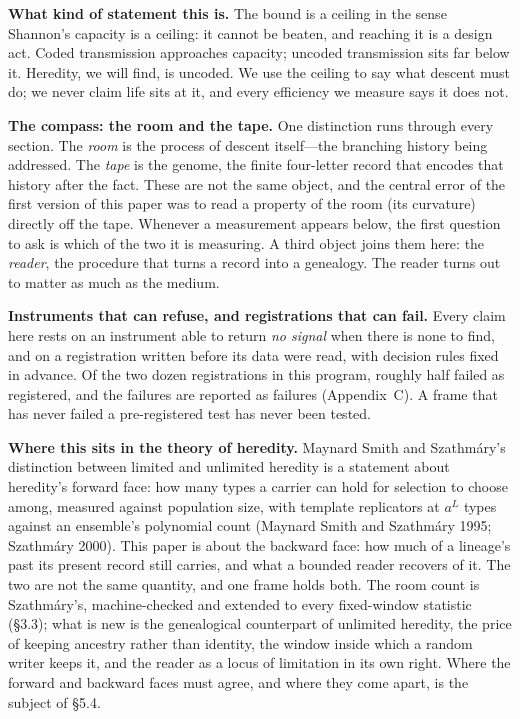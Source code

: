\documentclass[11pt]{article}
\begin{document}
\noindent\textbf{What kind of statement this is.} The bound is a ceiling in the sense Shannon's capacity is a ceiling: it cannot be beaten, and reaching it is a design act. Coded transmission approaches capacity; uncoded transmission sits far below it. Heredity, we will find, is uncoded. We use the ceiling to say what descent must do; we never claim life sits at it, and every efficiency we measure says it does not.

\medskip
\noindent\textbf{The compass: the room and the tape.} One distinction runs through every section. The \emph{room} is the process of descent itself---the branching history being addressed. The \emph{tape} is the genome, the finite four-letter record that encodes that history after the fact. These are not the same object, and the central error of the first version of this paper was to read a property of the room (its curvature) directly off the tape. Whenever a measurement appears below, the first question to ask is which of the two it is measuring. A third object joins them here: the \emph{reader}, the procedure that turns a record into a genealogy. The reader turns out to matter as much as the medium.

\medskip
\noindent\textbf{Instruments that can refuse, and registrations that can fail.} Every claim here rests on an instrument able to return \emph{no signal} when there is none to find, and on a registration written before its data were read, with decision rules fixed in advance. Of the two dozen registrations in this program, roughly half failed as registered, and the failures are reported as failures (Appendix~C). A frame that has never failed a pre-registered test has never been tested.

\medskip
\noindent\textbf{Where this sits in the theory of heredity.} Maynard Smith and Szathmáry's distinction between limited and unlimited heredity is a statement about heredity's forward face: how many types a carrier can hold for selection to choose among, measured against population size, with template replicators at $a^L$ types against an ensemble's polynomial count (Maynard Smith and Szathmáry 1995; Szathmáry 2000). This paper is about the backward face: how much of a lineage's past its present record still carries, and what a bounded reader recovers of it. The two are not the same quantity, and one frame holds both. The room count is Szathmáry's, machine-checked and extended to every fixed-window statistic (\S3.3); what is new is the genealogical counterpart of unlimited heredity, the price of keeping ancestry rather than identity, the window inside which a random writer keeps it, and the reader as a locus of limitation in its own right. Where the forward and backward faces must agree, and where they come apart, is the subject of \S5.4.
\end{document}
